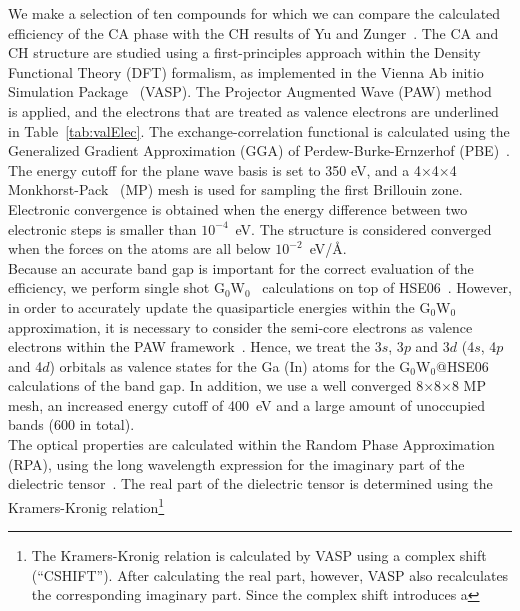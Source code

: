 \begin{refsection}
We make a selection of ten compounds for which we can compare the calculated 
efficiency of the CA phase with the CH results of Yu and Zunger~\cite{Yu2012}. 
The CA and CH structure are studied using a first-principles approach within 
the Density Functional Theory (DFT) formalism, as implemented in the Vienna Ab 
initio Simulation Package~\cite{Kresse1993, Kresse1996, Kresse1996b} (VASP). 
The Projector Augmented Wave (PAW) method~\cite{Blchl1994} is applied, and the 
electrons that are treated as valence electrons are underlined in 
Table~\ref{tab:valElec}. The exchange-correlation functional is calculated 
using the Generalized Gradient Approximation (GGA) of Perdew-Burke-Ernzerhof 
(PBE)~\cite{Perdew1996}. The energy cutoff for the plane wave basis is set to 
350 eV, and a 4$\times$4$\times$4 Monkhorst-Pack~\cite{Monkhorst1976} (MP) 
mesh is used for sampling the first Brillouin zone. Electronic convergence is 
obtained when the energy difference between two electronic steps is smaller 
than $10^{-4}$~\si{\electronvolt}. The structure is considered converged when 
the forces on the atoms are all below 
$10^{-2}$~\si{\electronvolt}/\si{\angstrom}. \\\vspace{0.5em} 
Because an accurate band gap is important for the correct evaluation of the 
efficiency, we perform single shot G$_0$W$_0$~\cite{Hybertsen1985} 
calculations on top of HSE06~\cite{Heyd2006}. However, in order to accurately 
update the quasiparticle energies within the G$_0$W$_0$ approximation, it is 
necessary to consider the semi-core electrons as valence electrons within the 
PAW framework~\cite{Fuchs2007}. Hence, we treat the 3$s$, 3$p$ and 3$d$ (4$s$, 
4$p$ and 4$d$) orbitals as valence states for the Ga (In) atoms for the 
G$_0$W$_0$@HSE06 calculations of the band gap. In addition, we use a well 
converged 8$\times$8$\times$8 MP mesh, an increased energy cutoff of 
400~\si{\electronvolt} and a large amount of unoccupied bands (600 in total). 
\\\vspace{0.5em} 
The optical properties are calculated within the Random Phase Approximation 
(RPA), using the long wavelength expression for the imaginary part of the 
dielectric tensor~\cite{Gajdos2006, Harl2007}. The real part of the dielectric 
tensor is determined using the Kramers-Kronig relation\footnote{The 
Kramers-Kronig relation is calculated by VASP using a complex shift 
(``CSHIFT''). After calculating the real part, however, VASP also recalculates 
the corresponding imaginary part. Since the complex shift introduces a 
}
\end{refsection}
